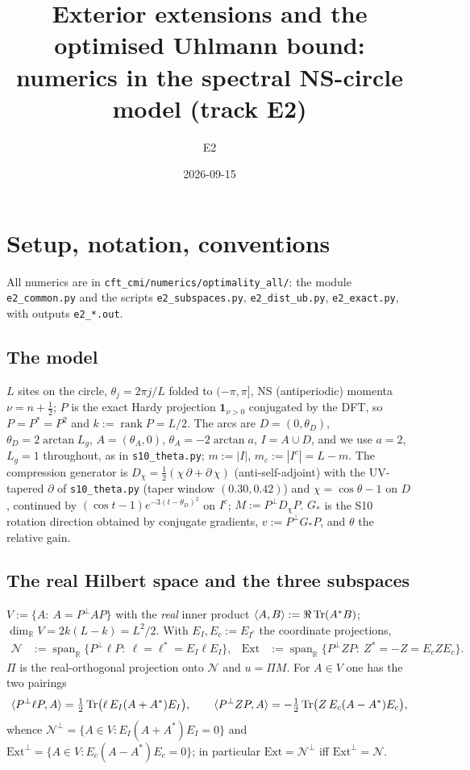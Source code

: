 \documentclass[11pt]{article}
\title{Exterior extensions and the optimised Uhlmann bound:\\ numerics in the spectral NS-circle model (track E2)}
\author{E2}
\date{2026-09-15}
\begin{document}
\maketitle
\tableofcontents

\section{Setup, notation, conventions}\label{sec:setup}

All numerics are in \texttt{cft\_cmi/numerics/optimality\_all/}: the module
\texttt{e2\_common.py} and the scripts \texttt{e2\_subspaces.py},
\texttt{e2\_dist\_ub.py}, \texttt{e2\_exact.py}, with outputs \texttt{e2\_*.out}.

\subsection{The model}
$L$ sites on the circle, $\theta_j=2\pi j/L$ folded to $(-\pi,\pi]$, NS (antiperiodic)
momenta $\nu=n+\tfrac12$; $P$ is the exact Hardy projection $\mathbf 1_{\nu>0}$ conjugated
by the DFT, so $P=P^*=P^2$ and $k:=\operatorname{rank}P=L/2$.  The arcs are
$D=(0,\theta_D)$, $\theta_D=2\arctan L_g$, $A=(\theta_A,0)$, $\theta_A=-2\arctan a$,
$I=A\cup D$, and we use $a=2$, $L_g=1$ throughout, as in \texttt{s10\_theta.py};
$m:=|I|$, $m_c:=|I^c|=L-m$.  The compression generator is
$D_\chi=\tfrac12(\chi\,\partial+\partial\,\chi)$ (anti-self-adjoint) with the UV-tapered
$\partial$ of \texttt{s10\_theta.py} (taper window $(0.30,0.42)$) and
$\chi=\cos\theta-1$ on $D$, continued by $(\cos t-1)e^{-3(t-\theta_D)^2}$ on $I^c$;
$M:=P^\perp D_\chi P$.  $G_*$ is the S10 rotation direction obtained by conjugate
gradients, $v:=P^\perp G_*P$, and $\theta$ the relative gain.

\subsection{The real Hilbert space and the three subspaces}
$V:=\{A:\ A=P^\perp AP\}$ with the \emph{real} inner product
$\langle A,B\rangle:=\Re\operatorname{Tr}(A^*B)$; $\dim_{\mathbb R}V=2k(L-k)=L^2/2$.  With
$E_I,E_c:=E_{I^c}$ the coordinate projections,
\begin{align}
 \mathcal N&:=\operatorname{span}_{\mathbb R}\{P^\perp\ell P:\ \ell=\ell^*=E_I\ell E_I\},&
 \mathrm{Ext}&:=\operatorname{span}_{\mathbb R}\{P^\perp Z P:\ Z^*=-Z=E_cZE_c\}.
\end{align}
$\Pi$ is the real-orthogonal projection onto $\mathcal N$ and $u=\Pi M$.
For $A\in V$ one has the two pairings
\begin{equation}\label{eq:pair}
 \langle P^\perp\ell P,A\rangle=\tfrac12\operatorname{Tr}\bigl(\ell\,E_I(A+A^*)E_I\bigr),\qquad
 \langle P^\perp Z P,A\rangle=-\tfrac12\operatorname{Tr}\bigl(Z\,E_c(A-A^*)E_c\bigr),
\end{equation}
whence $\mathcal N^\perp=\{A\in V: E_I(A+A^*)E_I=0\}$ and
$\mathrm{Ext}^\perp=\{A\in V:E_c(A-A^*)E_c=0\}$; in particular
$\mathrm{Ext}=\mathcal N^\perp$ iff $\mathrm{Ext}^\perp=\mathcal N$.
\end{document}
